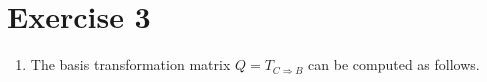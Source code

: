 \documentclass[a4paper]{article}
\begin{document}
\section*{Exercise 3}
\begin{enumerate}
  \item The basis transformation matrix $Q = T_{C \Rightarrow B}$ can be computed as follows.

\end{enumerate}
\end{document}
